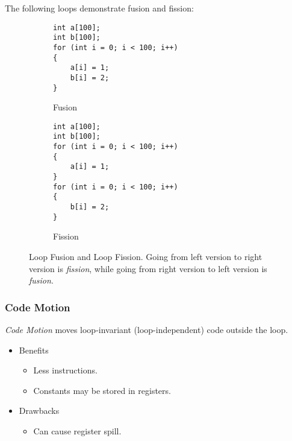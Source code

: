 \begin{example}
    The following loops demonstrate fusion and fission:
    
    \begin{figure}[H]
        \centering
        \begin{subfigure}{0.45\textwidth}
            \centering
            \begin{verbatim}
int a[100];
int b[100];
for (int i = 0; i < 100; i++)
{
    a[i] = 1;
    b[i] = 2;
}
            \end{verbatim}
            \caption{Fusion}
        \end{subfigure}
        \begin{subfigure}{0.45\textwidth}
            \centering
            \begin{verbatim}
int a[100];
int b[100];
for (int i = 0; i < 100; i++)
{
    a[i] = 1;
}
for (int i = 0; i < 100; i++)
{
    b[i] = 2;
}
            \end{verbatim}
            \caption{Fission}
        \end{subfigure}
        \caption{Loop Fusion and Loop Fission. Going from left version to right version is \textit{fission}, while going from right version to left version is \textit{fusion}.}
        \label{fig:loop-fusion-fission}
    \end{figure}
\end{example}

\subsubsection{Code Motion}

\begin{definition}
    \textit{Code Motion} moves loop-invariant (loop-independent) code outside the loop.
    
    \begin{itemize}
        \item Benefits
        \begin{itemize}
            \item Less instructions.
            \item Constants may be stored in registers.
        \end{itemize}
        \item Drawbacks
        \begin{itemize}
            \item Can cause register spill.
        \end{itemize}
    \end{itemize}
\end{definition}

